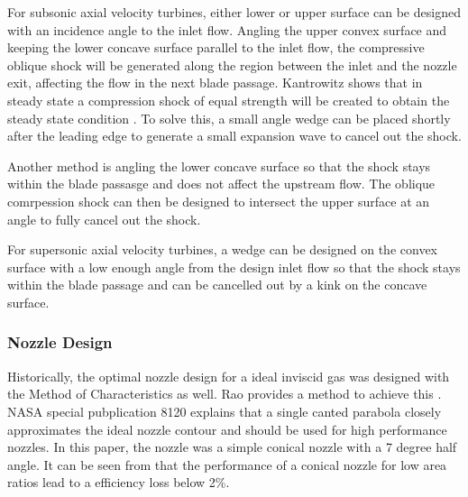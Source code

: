 For subsonic axial velocity turbines, either lower or upper surface can be designed with an incidence angle to the inlet flow. Angling the upper convex surface and keeping the lower concave surface parallel to the inlet flow, the compressive oblique shock will be generated along the region between the inlet and the nozzle exit, affecting the flow in the next blade passage. Kantrowitz shows that in steady state a compression shock of equal strength will be created to obtain the steady state condition \cite{kantrowitz}. To solve this, a small angle wedge can be placed shortly after the leading edge to generate a small expansion wave to cancel out the shock. 

Another method is angling the lower concave surface so that the shock stays within the blade passasge and does not affect the upstream flow. The oblique comrpession shock can then be designed to intersect the upper surface at an angle to fully cancel out the shock.

For supersonic axial velocity turbines, a wedge can be designed on the convex surface with a low enough angle from the design inlet flow so that the shock stays within the blade passage and can be cancelled out by a kink on the concave surface.



\subsubsection{Nozzle Design}

Historically, the optimal nozzle design for a ideal inviscid gas was designed with the Method of Characteristics as well. Rao provides a method to achieve this \cite{rao nozzle design}. NASA special pubplication 8120 explains that a single canted parabola closely approximates the ideal nozzle contour and should be used for high performance nozzles. In this paper, the nozzle was a simple conical nozzle with a 7 degree half angle. It can be seen from  that the performance of a conical nozzle for low area ratios lead to a efficiency loss below 2\%.
